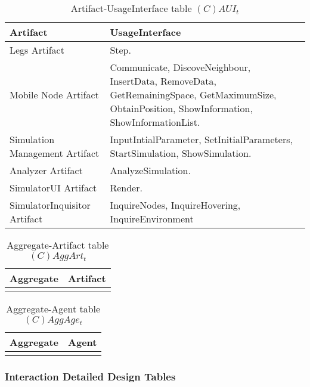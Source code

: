 \begin{table}[H]
	\centering
	\begin{tabular}{|p{4cm}|p{8cm}|}
			\hline
			\textbf{Artifact} & \textbf{UsageInterface} \\
			\hline
			Legs Artifact & Step. \\
			\hline
			Mobile Node Artifact & Communicate, DiscoveNeighbour, InsertData,
			RemoveData, GetRemainingSpace, GetMaximumSize, ObtainPosition,
			ShowInformation, ShowInformationList. \\
			\hline
			Simulation Management Artifact & InputIntialParameter,
			SetInitialParameters, StartSimulation, ShowSimulation. \\
			\hline
			Analyzer Artifact & AnalyzeSimulation. \\
			\hline
			SimulatorUI Artifact & Render. \\
			\hline
			SimulatorInquisitor Artifact & InquireNodes, InquireHovering,
			InquireEnvironment \\
			\hline
		\end{tabular}
	\caption{Artifact-UsageInterface table $(C)AUI_t$}
	\label{tab:cauit}
\end{table}

\begin{table}[H]
	\centering
	\begin{tabular}{|p{4cm}|p{8cm}|}
			\hline
			\textbf{Aggregate} & \textbf{Artifact} \\
			\hline
			& \\
			\hline
		\end{tabular}
	\caption{Aggregate-Artifact table $(C)AggArt_t$}
	\label{tab:caggartt}
\end{table}

\begin{table}[H]
	\centering
	\begin{tabular}{|p{4cm}|p{8cm}|}
			\hline
			\textbf{Aggregate} & \textbf{Agent} \\
			\hline
			& \\
			\hline
		\end{tabular}
	\caption{Aggregate-Agent table $(C)AggAge_t$}
	\label{tab:caggaget}
\end{table}

\subsubsection{Interaction Detailed Design Tables}

